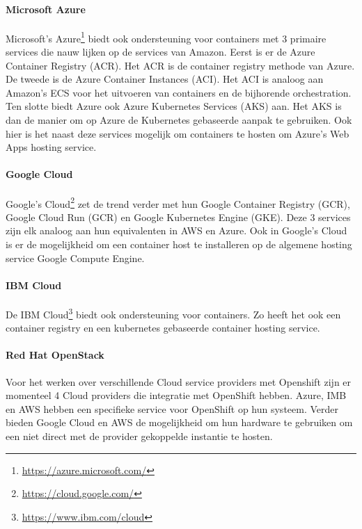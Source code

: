 \paragraph{Microsoft Azure}
Microsoft’s Azure\footnote{\url{https://azure.microsoft.com/}} biedt ook ondersteuning voor containers met 3 primaire services die nauw lijken op de services van Amazon. Eerst is er de Azure Container Registry (ACR). Het ACR is de container registry methode van Azure. De tweede is de Azure Container Instances (ACI). Het ACI is analoog aan Amazon’s ECS voor het uitvoeren van containers en de bijhorende orchestration. Ten slotte biedt Azure ook Azure Kubernetes Services (AKS) aan. Het AKS is dan de manier om op Azure de Kubernetes gebaseerde aanpak te gebruiken. Ook hier is het naast deze services mogelijk om containers te hosten om Azure’s Web Apps hosting service.
\paragraph{Google Cloud}
Google’s Cloud\footnote{\url{https://cloud.google.com/}} zet de trend verder met hun Google Container Registry (GCR), Google Cloud Run (GCR) en Google Kubernetes Engine (GKE). Deze 3 services zijn elk analoog aan hun equivalenten in AWS en Azure. Ook in Google's Cloud is er de mogelijkheid om een container host te installeren op de algemene hosting service Google Compute Engine.
\paragraph{IBM Cloud}
De IBM Cloud\footnote{\url{https://www.ibm.com/cloud}} biedt ook ondersteuning voor containers. Zo heeft het ook een container registry en een kubernetes gebaseerde container hosting service.
\paragraph{Red Hat OpenStack}
Voor het werken over verschillende Cloud service providers met Openshift zijn er momenteel 4 Cloud providers die integratie met OpenShift hebben. Azure, IMB en AWS hebben een specifieke service voor OpenShift op hun systeem. Verder bieden Google Cloud en AWS de mogelijkheid om hun hardware te gebruiken om een niet direct met de provider gekoppelde instantie te hosten.



